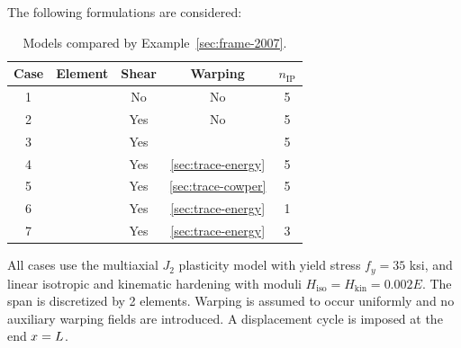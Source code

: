 {The following formulations are considered: 
\begin{table}[H]
    \centering
    \caption{Models compared by Example~\ref{sec:frame-2007}.}
    \label{tab:frame-2007}
    \begin{tabular}{ccccc}
\toprule
\textbf{Case} & \textbf{Element} & \textbf{Shear} & \textbf{Warping} & $n_{\mathrm{IP}}$ \\
\midrule 
1 &  \ForceFrame{} &  No &  No &  5  \\
2 &  \ForceFrame{} &  Yes &  No &  5  \\
3 &  \ForceFrame{} &  Yes &  \cite{scott2004software} &  5  \\
4 &  \ForceFrame{} &  Yes &  \cref{sec:trace-energy}  &  5  \\
5 &  \ForceFrame{} &  Yes &  \cref{sec:trace-cowper}  &  5  \\
6 &  \ExactFrame{} &  Yes &  \cref{sec:trace-energy}  &  1  \\
7 &  \ExactFrame{} &  Yes &  \cref{sec:trace-energy}  &  3  \\
\bottomrule
    \end{tabular}
\end{table}

%
All cases use the multiaxial \(J_2\) plasticity model with yield stress \(f_y = 35\) ksi, and linear isotropic and kinematic hardening with moduli \(H_{\mathrm{iso}} = H_{\mathrm{kin}} = 0.002E\). 
The span is discretized by 2 elements.  
Warping is assumed to occur uniformly and no auxiliary warping fields are introduced. 
A displacement cycle is imposed at the end \(x=L\). 


}

